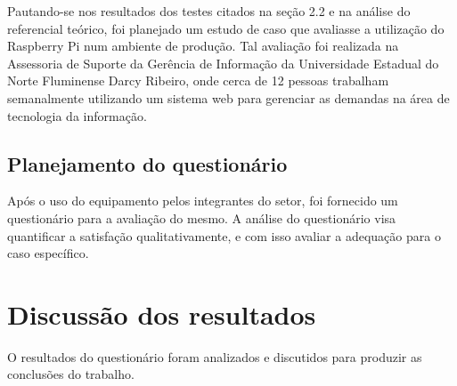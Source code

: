 Pautando-se nos resultados dos testes citados na seção 2.2 e na análise do referencial teórico, foi planejado um estudo de caso que avaliasse a utilização do Raspberry Pi num ambiente de produção. Tal avaliação foi realizada na Assessoria de Suporte da Gerência de Informação da Universidade Estadual do Norte Fluminense Darcy Ribeiro, onde cerca de 12 pessoas trabalham semanalmente utilizando um sistema web para gerenciar as demandas na área de tecnologia da informação.

\subsection{Planejamento do questionário}

Após o uso do equipamento pelos integrantes do setor, foi fornecido um questionário para a avaliação do mesmo. A análise do questionário visa quantificar a satisfação qualitativamente, e com isso avaliar a adequação para o caso específico.

\section{Discussão dos resultados}

O resultados do questionário foram analizados e discutidos para produzir as conclusões do trabalho.